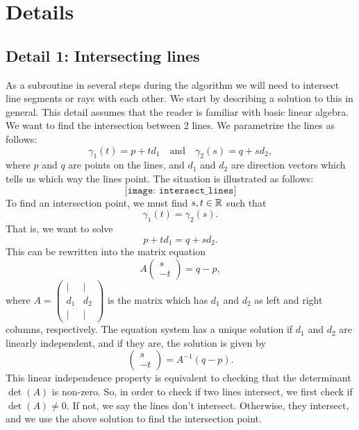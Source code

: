 \section{Details}

\subsection*{Detail 1: Intersecting lines}
As a subroutine in several steps during the algorithm we will need to intersect line segments or rays with each other. We start by describing a solution to this in general. This detail assumes that the reader is familiar with basic linear algebra. We want to find the intersection between 2 lines. We parametrize the lines as follows:
\[
    \gamma_1(t) = p + t d_1 \quad \text{and} \quad
    \gamma_2(s) = q + s d_2,
\]
where $p$ and $q$ are points on the lines, and $d_1$ and $d_2$ are direction vectors which tells us which way the lines point. The situation is illustrated as follows:
\[
    \texttt{[image: intersect\_lines]}
\]
To find an intersection point, we must find $s, t \in \mathbb{R}$ such that
\[
    \gamma_1(t) = \gamma_2(s).
\]
That is, we want to solve
\[
    p + t d_1 = q + s d_2.
\]
This can be rewritten into the matrix equation
\[
    A \begin{pmatrix}
        s \\
        -t
    \end{pmatrix}
    =
    q - p,
\]
where $A = \begin{pmatrix} \mid & \mid \\ d_1 & d_2 \\ \mid & \mid \end{pmatrix}$ is the matrix which has $d_1$ and $d_2$ as left and right columns, respectively. The equation system has a unique solution if $d_1$ and $d_2$ are linearly independent, and if they are, the solution is given by
\[
    \begin{pmatrix}
        s \\
        -t
    \end{pmatrix}
    =
    A^{-1} (q - p).
\]
This linear independence property is equivalent to checking that the determinant $\det(A)$ is non-zero. So, in order to check if two lines intersect, we first check if $\det(A) \ne 0$. If not, we say the lines don't intersect. Otherwise, they intersect, and we use the above solution to find the intersection point.

